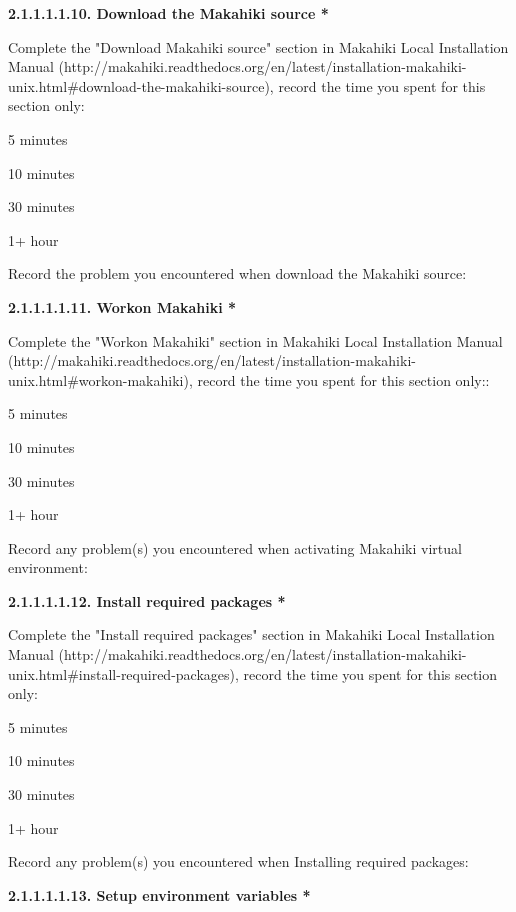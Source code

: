 {\bf 2.1.1.1.1.10. Download the Makahiki source *}

Complete the "Download Makahiki source" section in Makahiki Local Installation Manual (http://makahiki.readthedocs.org/en/latest/installation-makahiki-unix.html\#download-the-makahiki-source), record the time you spent for this section only:

\begin{compactitem}
\item 5 minutes
\item  10 minutes
\item  30 minutes
\item  1+ hour
\end{compactitem}

Record the problem you encountered when download the Makahiki source:

{\bf 2.1.1.1.1.11. Workon Makahiki *}

Complete the "Workon Makahiki" section in Makahiki Local Installation Manual (http://makahiki.readthedocs.org/en/latest/installation-makahiki-unix.html\#workon-makahiki), record the time you spent for this section only::

\begin{compactitem}
\item 5 minutes
\item  10 minutes
\item  30 minutes
\item  1+ hour
\end{compactitem}

Record any problem(s) you encountered when activating Makahiki virtual environment:

{\bf 2.1.1.1.1.12. Install required packages *}

Complete the "Install required packages" section in Makahiki Local Installation Manual (http://makahiki.readthedocs.org/en/latest/installation-makahiki-unix.html\#install-required-packages), record the time you spent for this section only:

\begin{compactitem}
\item 5 minutes
\item  10 minutes
\item  30 minutes
\item  1+ hour
\end{compactitem}

Record any problem(s) you encountered when Installing required packages:

{\bf 2.1.1.1.1.13. Setup environment variables *}

